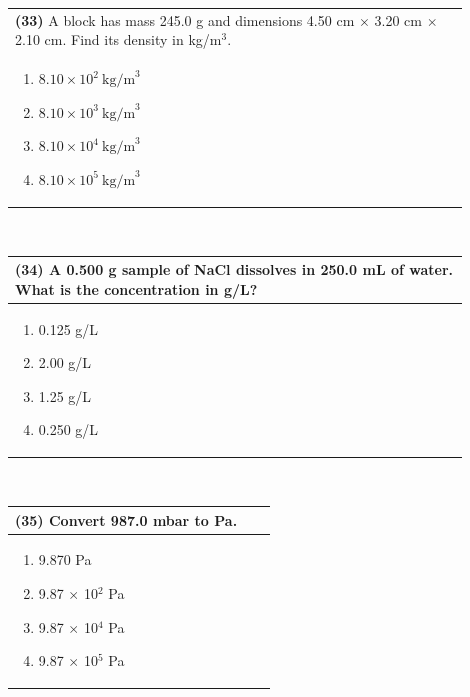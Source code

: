 \documentclass{article}
\begin{document}
\vspace{0.5cm}
\noindent \begin{tabular}{|p{0.9\linewidth}|}
\hline
\vspace{0.2cm}
\textbf{(33)} A block has mass 245.0 g and dimensions 4.50 cm $\times$ 3.20 cm $\times$ 2.10 cm. Find its density in kg/m$^3$.\\
\begin{minipage}[t]{0.85\linewidth}
\begin{enumerate}[label=\alph*.]
   \item $8.10\times10^{2}~\text{kg/m}^3$
   \item $8.10\times10^{3}~\text{kg/m}^3$
   \item $8.10\times10^{4}~\text{kg/m}^3$
   \item $8.10\times10^{5}~\text{kg/m}^3$
\end{enumerate}
\end{minipage}\\
\hline
\end{tabular}
\\

 \newpage 
\noindent \begin{tabular}{|p{0.9\linewidth}|}
\hline
\vspace{0.2cm}
\textbf{(34)} A 0.500 g sample of NaCl dissolves in 250.0 mL of water. What is the concentration in g/L?\\
\hline
\vspace{0.2cm}
\begin{minipage}[t]{0.85\linewidth}
\begin{enumerate}[label=\alph*.]
\item 0.125 g/L
\item 2.00 g/L
\item 1.25 g/L
\item 0.250 g/L
\end{enumerate}
\end{minipage} \\
\hline
\end{tabular}
\\

\vspace{0.5cm}
\noindent \begin{tabular}{|p{0.9\linewidth}|}
\hline
\vspace{0.2cm}
\textbf{(35)} Convert 987.0 mbar to Pa.\\
\hline
\vspace{0.2cm}
\begin{minipage}[t]{0.85\linewidth}
\begin{enumerate}[label=\alph*.]
\item 9.870 Pa
\item 9.87 $\times$ 10$^2$ Pa
\item 9.87 $\times$ 10$^4$ Pa
\item 9.87 $\times$ 10$^5$ Pa
\end{enumerate}
\end{minipage} \\
\hline
\end{tabular}
\\
\end{document}
